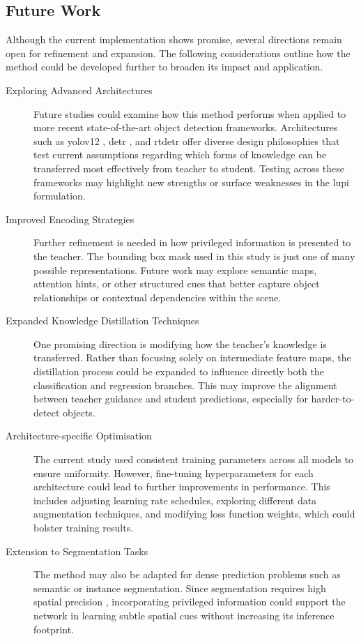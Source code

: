 \subsection*{Future Work}

Although the current implementation shows promise, several directions remain open for refinement and expansion. The following considerations outline how the method could be developed further to broaden its impact and application.

\begin{description}

\item[Exploring Advanced Architectures]
Future studies could examine how this method performs when applied to more recent state-of-the-art object detection frameworks. Architectures such as \gls{yolo}v12 \cite{yolov12}, \gls{detr} \cite{detr}, and \gls{rtdetr} \cite{rt-detr} offer diverse design philosophies that test current assumptions regarding which forms of knowledge can be transferred most effectively from teacher to student. Testing across these frameworks may highlight new strengths or surface weaknesses in the \gls{lupi} formulation.

\item[Improved Encoding Strategies]
Further refinement is needed in how privileged information is presented to the teacher. The bounding box mask used in this study is just one of many possible representations. Future work may explore semantic maps, attention hints, or other structured cues that better capture object relationships or contextual dependencies within the scene.

\item[Expanded Knowledge Distillation Techniques]
One promising direction is modifying how the teacher’s knowledge is transferred. Rather than focusing solely on intermediate feature maps, the distillation process could be expanded to influence directly both the classification and regression branches. This may improve the alignment between teacher guidance and student predictions, especially for harder-to-detect objects.

\item[Architecture-specific Optimisation]
The current study used consistent training parameters across all models to ensure uniformity. However, fine-tuning hyperparameters for each architecture could lead to further improvements in performance. This includes adjusting learning rate schedules, exploring different data augmentation techniques, and modifying loss function weights, which could bolster training results.

\item[Extension to Segmentation Tasks]
The method may also be adapted for dense prediction problems such as semantic or instance segmentation. Since segmentation requires high spatial precision \cite{maskrcnn}, incorporating privileged information could support the network in learning subtle spatial cues without increasing its inference footprint.

\end{description}

